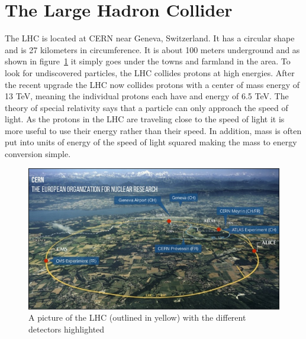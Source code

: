
\section{The Large Hadron Collider}

The LHC is located at CERN near Geneva, Switzerland. It has a circular shape and is 27 kilometers in circumference. It is about 100 meters underground and as shown in figure~\ref{fig:LHC} it simply goes under the towns and farmland in the area. To look for undiscovered particles, the LHC collides protons at high energies. After the recent upgrade the LHC now collides protons with a center of mass energy of 13 TeV, meaning the individual protons each have and energy of 6.5 TeV. The theory of special relativity says that a particle can only approach the speed of light. As the protons in the LHC are traveling close to the speed of light it is more useful to use their energy rather than their speed. In addition, mass is often put into units of energy of the speed of light squared making the mass to energy conversion simple. 

\begin{figure}
\centering
\includegraphics[width=0.8\linewidth]{Figures/LHC.png}
\caption{A picture of the LHC (outlined in yellow) with the different detectors highlighted}
\label{fig:LHC}
\end{figure}

